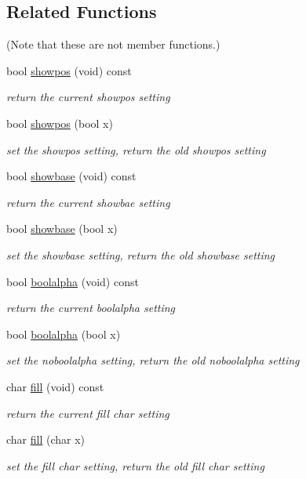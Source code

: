 \subsection*{Related Functions}
(Note that these are not member functions.) \begin{DoxyCompactItemize}
\item 
bool \hyperlink{classhwlib_1_1ostream_a5b8e4c021711ab0fbbefcd2df29c03a7}{showpos} (void) const 
\begin{DoxyCompactList}\small\item\em return the current showpos setting \end{DoxyCompactList}\item 
bool \hyperlink{classhwlib_1_1ostream_a63eb8b78e5a4a3250043b4b9ecb35f16}{showpos} (bool x)
\begin{DoxyCompactList}\small\item\em set the showpos setting, return the old showpos setting \end{DoxyCompactList}\item 
bool \hyperlink{classhwlib_1_1ostream_aa47993e8c6771ed093859416133b3724}{showbase} (void) const 
\begin{DoxyCompactList}\small\item\em return the current showbae setting \end{DoxyCompactList}\item 
bool \hyperlink{classhwlib_1_1ostream_ad3290e2669fd1ced136efc657f4478a2}{showbase} (bool x)
\begin{DoxyCompactList}\small\item\em set the showbase setting, return the old showbase setting \end{DoxyCompactList}\item 
bool \hyperlink{classhwlib_1_1ostream_aa4ad6c4c344926b02b165e89bddb98b5}{boolalpha} (void) const 
\begin{DoxyCompactList}\small\item\em return the current boolalpha setting \end{DoxyCompactList}\item 
bool \hyperlink{classhwlib_1_1ostream_a4b94d035da5b074afee5fdef06dcf737}{boolalpha} (bool x)
\begin{DoxyCompactList}\small\item\em set the noboolalpha setting, return the old noboolalpha setting \end{DoxyCompactList}\item 
char \hyperlink{classhwlib_1_1ostream_a11cfd99e60bf22ace9e11c40da61d3ec}{fill} (void) const 
\begin{DoxyCompactList}\small\item\em return the current fill char setting \end{DoxyCompactList}\item 
char \hyperlink{classhwlib_1_1ostream_a7d7d3d7d7bd7896c51649a8c9c0a236c}{fill} (char x)
\begin{DoxyCompactList}\small\item\em set the fill char setting, return the old fill char setting \end{DoxyCompactList}\end{DoxyCompactItemize}


